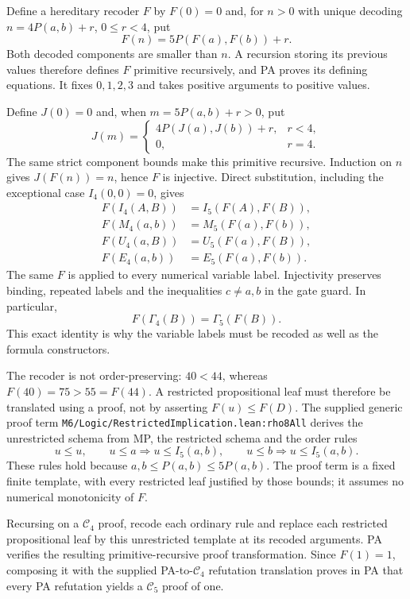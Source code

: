 Define a hereditary recoder $F$ by $F(0)=0$ and, for $n>0$ with unique
decoding $n=4P(a,b)+r$, $0\le r<4$, put
\[
                       F(n)=5P(F(a),F(b))+r.
\]
Both decoded components are smaller than $n$. A recursion storing its
previous values therefore defines $F$ primitive recursively, and PA
proves its defining equations. It fixes $0,1,2,3$ and takes positive
arguments to positive values.

Define $J(0)=0$ and, when $m=5P(a,b)+r>0$, put
\[
 J(m)=\begin{cases}4P(J(a),J(b))+r,&r<4,\\0,&r=4.\end{cases}
\]
The same strict component bounds make this primitive recursive. Induction
on $n$ gives $J(F(n))=n$, hence $F$ is injective. Direct substitution,
including the exceptional case $I_4(0,0)=0$, gives
\[
\begin{aligned}
 F(I_4(A,B))&=I_5(F(A),F(B)),\\
 F(M_4(a,b))&=M_5(F(a),F(b)),\\
 F(U_4(a,B))&=U_5(F(a),F(B)),\\
 F(E_4(a,b))&=E_5(F(a),F(b)).
\end{aligned}
\]
The same $F$ is applied to every numerical variable label. Injectivity
preserves binding, repeated labels and the inequalities $c\ne a,b$ in the
gate guard. In particular,
\[
                         F(\Gamma_4(B))=\Gamma_5(F(B)).
\]
This exact identity is why the variable labels must be recoded as well as
the formula constructors.

The recoder is not order-preserving: $40<44$, whereas $F(40)=75>55=F(44)$.
A restricted propositional leaf must therefore be translated using a
proof, not by asserting $F(u)\le F(D)$. The supplied generic proof term
\texttt{M6/Logic/RestrictedImplication.lean:rho8All} derives the
unrestricted schema from MP, the restricted schema and the order rules
\[
 u\le u,\qquad u\le a\Longrightarrow u\le I_5(a,b),\qquad
 u\le b\Longrightarrow u\le I_5(a,b).
\]
These rules hold because $a,b\le P(a,b)\le5P(a,b)$. The proof term is a
fixed finite template, with every restricted leaf justified by those
bounds; it assumes no numerical monotonicity of $F$.

Recursing on a $\mathcal C_4$ proof, recode each ordinary rule and replace
each restricted propositional leaf by this unrestricted template at its
recoded arguments. PA verifies the resulting primitive-recursive proof
transformation. Since $F(1)=1$, composing it with the supplied
PA-to-$\mathcal C_4$ refutation translation proves in PA that every PA
refutation yields a $\mathcal C_5$ proof of one.

